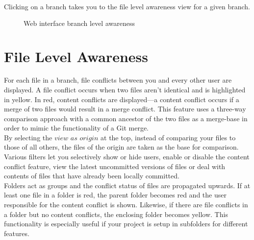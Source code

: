 Clicking on a branch takes you to the file level awareness view for a given branch.



\begin{figure}[h!]
  \centering
  \caption{Web interface branch level awareness}
  \label{fig:branchlevel}
\end{figure}





\section{File Level Awareness}

For each file in a branch, file conflicts between you and every other user are displayed. A file conflict occurs when two files aren't identical and is highlighted in yellow. In red, content conflicts are displayed---a content conflict occurs if a merge of two files would result in a merge conflict. This feature uses a three-way comparison approach with a common ancestor of the two files as a merge-base in order to mimic the functionality of a Git merge. \\

By selecting the $view$ $as$ $origin$ at the top, instead of comparing your files to those of all others, the files of the origin are taken as the base for comparison. Various filters let you selectively show or hide users, enable or disable the content conflict feature, view the latest uncommitted versions of files or deal with contents of files that have already been locally committed. \\

Folders act as groups and the conflict status of files are propagated upwards. If at least one file in a folder is red, the parent folder becomes red and the user responsible for the content conflict is shown. Likewise, if there are file conflicts in a folder but no content conflicts, the enclosing folder becomes yellow. This functionality is especially useful if your project is setup in subfolders for different features. \\

